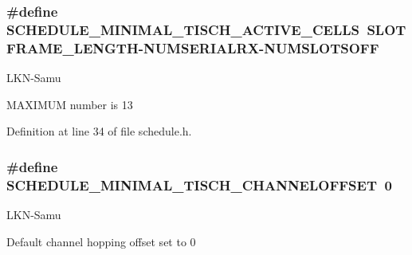 \subsubsection[{\texorpdfstring{S\+C\+H\+E\+D\+U\+L\+E\+\_\+\+M\+I\+N\+I\+M\+A\+L\+\_\+6\+T\+I\+S\+C\+H\+\_\+\+A\+C\+T\+I\+V\+E\+\_\+\+C\+E\+L\+LS}{SCHEDULE_MINIMAL_6TISCH_ACTIVE_CELLS}}]{\setlength{\rightskip}{0pt plus 5cm}\#define S\+C\+H\+E\+D\+U\+L\+E\+\_\+\+M\+I\+N\+I\+M\+A\+L\+\_\+T\+I\+S\+C\+H\+\_\+\+A\+C\+T\+I\+V\+E\+\_\+\+C\+E\+L\+LS~{\bf S\+L\+O\+T\+F\+R\+A\+M\+E\+\_\+\+L\+E\+N\+G\+TH}-\/{\bf N\+U\+M\+S\+E\+R\+I\+A\+L\+RX}-\/{\bf N\+U\+M\+S\+L\+O\+T\+S\+O\+FF}}\hypertarget{group___schedule_ga299d7e29eb70888b68ace83fd3f1a8df}{}\label{group___schedule_ga299d7e29eb70888b68ace83fd3f1a8df}
\begin{DoxyRefDesc}{L\+K\+N-\/\+Samu}
\item[\hyperlink{_l_k_n_code_edits__LKN_code_edits000025}{L\+K\+N-\/\+Samu}]M\+A\+X\+I\+M\+UM number is 13 \end{DoxyRefDesc}


Definition at line 34 of file schedule.\+h.

\subsubsection[{\texorpdfstring{S\+C\+H\+E\+D\+U\+L\+E\+\_\+\+M\+I\+N\+I\+M\+A\+L\+\_\+6\+T\+I\+S\+C\+H\+\_\+\+C\+H\+A\+N\+N\+E\+L\+O\+F\+F\+S\+ET}{SCHEDULE_MINIMAL_6TISCH_CHANNELOFFSET}}]{\setlength{\rightskip}{0pt plus 5cm}\#define S\+C\+H\+E\+D\+U\+L\+E\+\_\+\+M\+I\+N\+I\+M\+A\+L\+\_\+T\+I\+S\+C\+H\+\_\+\+C\+H\+A\+N\+N\+E\+L\+O\+F\+F\+S\+ET~0}\hypertarget{group___schedule_ga485a603a3e03059901c4fc5fc968a1e9}{}\label{group___schedule_ga485a603a3e03059901c4fc5fc968a1e9}
\begin{DoxyRefDesc}{L\+K\+N-\/\+Samu}
\item[\hyperlink{_l_k_n_code_edits__LKN_code_edits000027}{L\+K\+N-\/\+Samu}]Default channel hopping offset set to 0 \end{DoxyRefDesc}


